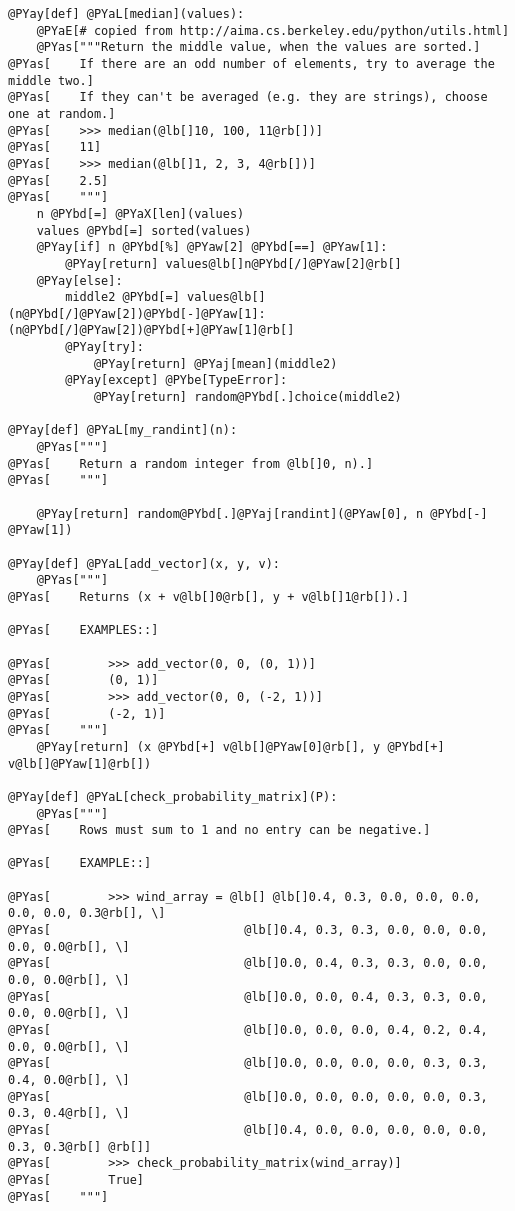 \begin{Verbatim}[commandchars=@\[\]]
@PYay[def] @PYaL[median](values):
    @PYaE[# copied from http://aima.cs.berkeley.edu/python/utils.html]
    @PYas["""Return the middle value, when the values are sorted.]
@PYas[    If there are an odd number of elements, try to average the middle two.]
@PYas[    If they can't be averaged (e.g. they are strings), choose one at random.]
@PYas[    >>> median(@lb[]10, 100, 11@rb[])]
@PYas[    11]
@PYas[    >>> median(@lb[]1, 2, 3, 4@rb[])]
@PYas[    2.5]
@PYas[    """]
    n @PYbd[=] @PYaX[len](values)
    values @PYbd[=] sorted(values)
    @PYay[if] n @PYbd[%] @PYaw[2] @PYbd[==] @PYaw[1]:
        @PYay[return] values@lb[]n@PYbd[/]@PYaw[2]@rb[]
    @PYay[else]:
        middle2 @PYbd[=] values@lb[](n@PYbd[/]@PYaw[2])@PYbd[-]@PYaw[1]:(n@PYbd[/]@PYaw[2])@PYbd[+]@PYaw[1]@rb[]
        @PYay[try]:
            @PYay[return] @PYaj[mean](middle2)
        @PYay[except] @PYbe[TypeError]:
            @PYay[return] random@PYbd[.]choice(middle2)

@PYay[def] @PYaL[my_randint](n):
    @PYas["""]
@PYas[    Return a random integer from @lb[]0, n).]
@PYas[    """]

    @PYay[return] random@PYbd[.]@PYaj[randint](@PYaw[0], n @PYbd[-] @PYaw[1])

@PYay[def] @PYaL[add_vector](x, y, v):
    @PYas["""]
@PYas[    Returns (x + v@lb[]0@rb[], y + v@lb[]1@rb[]).]

@PYas[    EXAMPLES::]

@PYas[        >>> add_vector(0, 0, (0, 1))]
@PYas[        (0, 1)]
@PYas[        >>> add_vector(0, 0, (-2, 1))]
@PYas[        (-2, 1)]
@PYas[    """]
    @PYay[return] (x @PYbd[+] v@lb[]@PYaw[0]@rb[], y @PYbd[+] v@lb[]@PYaw[1]@rb[])

@PYay[def] @PYaL[check_probability_matrix](P):
    @PYas["""]
@PYas[    Rows must sum to 1 and no entry can be negative.]

@PYas[    EXAMPLE::]

@PYas[        >>> wind_array = @lb[] @lb[]0.4, 0.3, 0.0, 0.0, 0.0, 0.0, 0.0, 0.3@rb[], \]
@PYas[                           @lb[]0.4, 0.3, 0.3, 0.0, 0.0, 0.0, 0.0, 0.0@rb[], \]
@PYas[                           @lb[]0.0, 0.4, 0.3, 0.3, 0.0, 0.0, 0.0, 0.0@rb[], \]
@PYas[                           @lb[]0.0, 0.0, 0.4, 0.3, 0.3, 0.0, 0.0, 0.0@rb[], \]
@PYas[                           @lb[]0.0, 0.0, 0.0, 0.4, 0.2, 0.4, 0.0, 0.0@rb[], \]
@PYas[                           @lb[]0.0, 0.0, 0.0, 0.0, 0.3, 0.3, 0.4, 0.0@rb[], \]
@PYas[                           @lb[]0.0, 0.0, 0.0, 0.0, 0.0, 0.3, 0.3, 0.4@rb[], \]
@PYas[                           @lb[]0.4, 0.0, 0.0, 0.0, 0.0, 0.0, 0.3, 0.3@rb[] @rb[]]
@PYas[        >>> check_probability_matrix(wind_array)]
@PYas[        True]
@PYas[    """]


\end{Verbatim}
